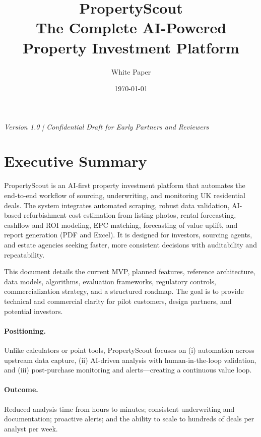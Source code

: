 \documentclass[12pt,a4paper]{article}
\title{\vspace{-2em}\textbf{PropertyScout}\\[0.4em]\large The Complete AI-Powered Property Investment Platform}
\author{White Paper}
\date{\today}
\begin{document}
\maketitle
\begin{center}
\textit{Version 1.0 \quad | \quad Confidential Draft for Early Partners and Reviewers}
\end{center}
\vspace{1em}
\tableofcontents
\newpage

\section{Executive Summary}
PropertyScout is an AI-first property investment platform that automates the end-to-end workflow of sourcing, underwriting, and monitoring UK residential deals. The system integrates automated scraping, robust data validation, AI-based refurbishment cost estimation from listing photos, rental forecasting, cashflow and ROI modeling, EPC matching, forecasting of value uplift, and report generation (PDF and Excel). It is designed for investors, sourcing agents, and estate agencies seeking faster, more consistent decisions with auditability and repeatability.

This document details the current MVP, planned features, reference architecture, data models, algorithms, evaluation frameworks, regulatory controls, commercialization strategy, and a structured roadmap. The goal is to provide technical and commercial clarity for pilot customers, design partners, and potential investors.

\paragraph{Positioning.} Unlike calculators or point tools, PropertyScout focuses on (i) automation across upstream data capture, (ii) AI-driven analysis with human-in-the-loop validation, and (iii) post-purchase monitoring and alerts—creating a continuous value loop.

\paragraph{Outcome.} Reduced analysis time from hours to minutes; consistent underwriting and documentation; proactive alerts; and the ability to scale to hundreds of deals per analyst per week.

\end{document}
